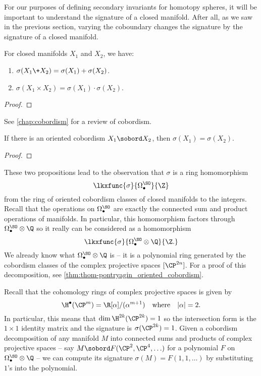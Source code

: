 For our purposes of defining secondary invariants for homotopy spheres, it will be important to understand the signature of a closed manifold. After all, as we saw in the previous section, varying the coboundary changes the signature by the signature of a closed manifold.

\begin{proposition}
	For closed manifolds $X_1$ and $X_2$, we have:
	\begin{enumerate}
		\item $\sigma(X_1\+ X_2) = \sigma(X_1)+\sigma(X_2)$.
		\item $\sigma(X_1\times X_2) = \sigma(X_1)\cdot\sigma(X_2)$.
	\end{enumerate}
\end{proposition}
\begin{proof}
\end{proof}

See \cref{chap:cobordism} for a review of cobordism.

\begin{proposition}
	If there is an oriented cobordism $X_1 \sobord X_2$, then $\sigma(X_1)=\sigma(X_2)$.
\end{proposition}
\begin{proof}
\end{proof}

These two propositions lead to the observation that $\sigma$ is a ring homomorphism
\[
	\lkxfunc{\sigma}{\Omega^\SO_\bullet}{\Z}
\]
from the ring of oriented cobordism classes of closed manifolds to the integers. Recall that the operations on $\Omega^\SO_\bullet$ are exactly the connected sum and product operations of manifolds. In particular, this homomorphism factors through $\Omega^\SO_\bullet\otimes \Q$ so it really can be considered as a homomorphism
\[
	\lkxfunc{\sigma}{\Omega^\SO_\bullet\otimes \Q}{\Z.}
\]
We already know what $\Omega^\SO_\bullet\otimes \Q$ is -- it is a polynomial ring generated by the cobordism classes of the complex projective spaces $[\CP^{2n}]$. For a proof of this decomposition, see \cref{thm:thom-pontryagin_oriented_cobordism}.

Recall that the cohomology rings of complex projective spaces is given by
\[
	\H^\bullet(\CP^{m}) = \R[\alpha]/(\alpha^{m+1})\quad\textrm{where}\quad |\alpha|=2.
\]
In particular, this means that $\dim \H^{2k}(\CP^{2k})=1$ so the intersection form is the $1\times 1$ identity matrix and the signature is $\sigma(\CP^{2k})=1$. Given a cobordism decomposition of any manifold $M$ into connected sums and products of complex projective spaces -- say $M\sobord F(\CP^2,\CP^4,\ldots)$ for a polynomial $F$ on $\Omega^\SO_\bullet\otimes \Q$ -- we can compute its signature $\sigma(M)=F(1,1,\ldots)$ by substituting $1$'s into the polynomial.

